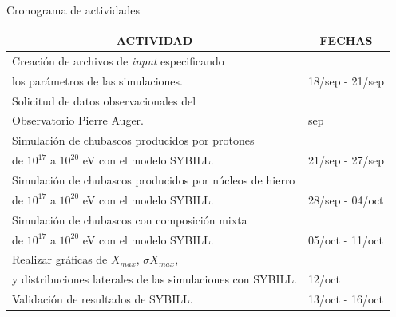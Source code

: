 \documentclass[10pt]{beamer}
\begin{document}
\begin{frame}{Cronograma de actividades}

\begin{footnotesize}
\begin{table}
\bgroup
\def\arraystretch{1.5}
\begin{tabular}{|l|l|}
\hline
\multicolumn{1}{|c|}{\textbf{ACTIVIDAD}}                                            & \multicolumn{1}{c|}{\textbf{FECHAS}} \\ \hline

Creación de archivos de \textit{input} especificando \\los parámetros de las simulaciones.						& 18/sep - 21/sep			\\ \hline	
Solicitud de datos observacionales del \\Observatorio Pierre Auger.         									& sep                         \\ \hline
Simulación de chubascos producidos por protones \\de $10^{17}$ a $10^{20}$ eV con el modelo SYBILL. 				& 21/sep - 27/sep             \\ \hline
Simulación de chubascos producidos por núcleos de hierro \\ de $10^{17}$ a $10^{20}$ eV con el modelo SYBILL. 	& 28/sep - 04/oct             \\ \hline
Simulación de chubascos con composición mixta \\de $10^{17}$ a $10^{20}$ eV con el modelo SYBILL.   				& 05/oct - 11/oct             \\ \hline
Realizar gráficas de $X_{max}$, $\sigma X_{max}$, \\y distribuciones laterales de las simulaciones con SYBILL.	& 12/oct  		              \\ \hline
Validación de resultados de SYBILL.              																& 13/oct - 16/oct             \\ \hline

\end{tabular}
\egroup
\end{table}
\end{footnotesize}
\end{frame}
\end{document}
